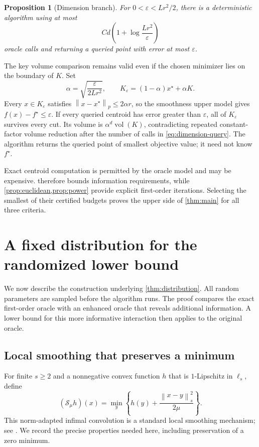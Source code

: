 \documentclass[11pt]{article}
\newcommand{\cS}{\mathcal{S}}
\newcommand{\norm}[2]{\left\lVert #1\right\rVert_{#2}}
\newcommand{\vol}{\operatorname{vol}}
\newcommand{\eps}{\varepsilon}
\newtheorem{proposition}[proposition]{Proposition}
\theoremstyle{definition}
\theoremstyle{remark}
\begin{document}
\begin{proposition}[Dimension branch]
\label{prop:dimension}
For $0<\eps<Lr^2/2$, there is a deterministic algorithm using at most
\begin{equation}
\label{eq:dimension-query}
 Cd\left(1+\log\frac{Lr^2}{\eps}\right)
\end{equation}
oracle calls and returning a queried point with error at most $\eps$.
\end{proposition}

The key volume comparison remains valid even if the chosen minimizer
lies on the boundary of $K$. Set
\[
 \alpha=\sqrt{\frac{\eps}{2Lr^2}},\qquad
 K_\eps=(1-\alpha)x^\star+\alpha K.
\]
Every $x\in K_\eps$ satisfies $\norm{x-x^\star}{p}\le2\alpha r$,
so the smoothness upper model gives $f(x)-f^\star\le\eps$.
If every queried centroid has error greater than $\eps$, all of
$K_\eps$ survives every cut. Its volume is
$\alpha^d\vol(K)$, contradicting repeated constant-factor volume
reduction after the number of calls in \cref{eq:dimension-query}.
The algorithm returns the queried point of smallest objective value;
it need not know $f^\star$.

Exact centroid computation is permitted by the oracle model and may
be expensive.  therefore bounds information
requirements, while \cref{prop:euclidean,prop:power} provide explicit
first-order iterations. Selecting the smallest of their certified
budgets proves the upper side of \cref{thm:main} for all three criteria.


\section{A fixed distribution for the randomized lower bound}
\label{sec:lower}

We now describe the construction underlying \cref{thm:distribution}.
All random parameters are sampled before the algorithm runs. The proof
compares the exact first-order oracle with an enhanced oracle that
reveals additional information. A lower bound for this more informative
interaction then applies to the original oracle.

\subsection{Local smoothing that preserves a minimum}

For finite $s\ge2$ and a nonnegative convex function $h$ that is
$1$-Lipschitz in $\ell_s$, define
\begin{equation}
\label{eq:smoothing}
 (\cS_\mu h)(x)
 =\min_y\left\{h(y)+\frac{\norm{x-y}{s}^2}{2\mu}\right\}.
\end{equation}
This norm-adapted infimal convolution is a standard local smoothing
mechanism; see \citet{GuzmanNemirovski2015}. We record the precise
properties needed here, including preservation of a zero minimum.
\end{document}
